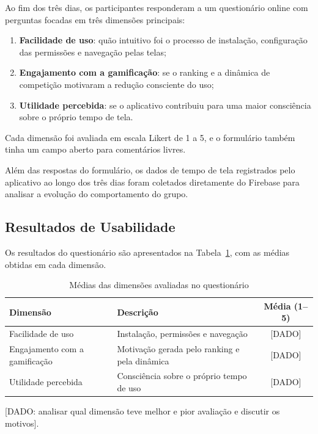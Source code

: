 Ao fim dos três dias, os participantes responderam a um questionário online com perguntas focadas em três dimensões principais:

\begin{enumerate}
    \item \textbf{Facilidade de uso}: quão intuitivo foi o processo de instalação, configuração das permissões e navegação pelas telas;
    \item \textbf{Engajamento com a gamificação}: se o ranking e a dinâmica de competição motivaram a redução consciente do uso;
    \item \textbf{Utilidade percebida}: se o aplicativo contribuiu para uma maior consciência sobre o próprio tempo de tela.
\end{enumerate}

Cada dimensão foi avaliada em escala Likert de 1 a 5, e o formulário também tinha um campo aberto para comentários livres.

Além das respostas do formulário, os dados de tempo de tela registrados pelo aplicativo ao longo dos três dias foram coletados diretamente do Firebase para analisar a evolução do comportamento do grupo.

\subsection{Resultados de Usabilidade}

Os resultados do questionário são apresentados na Tabela~\ref{tab:usabilidade}, com as médias obtidas em cada dimensão.

\begin{table}[htbp]
\centering
\caption{Médias das dimensões avaliadas no questionário}
\label{tab:usabilidade}
\begin{tabularx}{\textwidth}{|l|X|c|}
\hline
\rowcolor{verdeclaro}
\textbf{Dimensão} & \textbf{Descrição} & \textbf{Média (1--5)} \\ \hline
Facilidade de uso & Instalação, permissões e navegação & [DADO] \\ \hline
Engajamento com a gamificação & Motivação gerada pelo ranking e pela dinâmica & [DADO] \\ \hline
Utilidade percebida & Consciência sobre o próprio tempo de uso & [DADO] \\ \hline
\end{tabularx}
\end{table}

[DADO: analisar qual dimensão teve melhor e pior avaliação e discutir os motivos].

